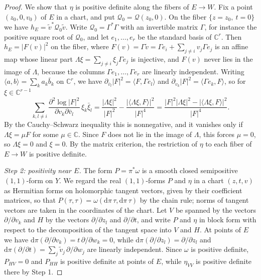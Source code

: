\begin{proof}
We show that $\eta$ is positive definite along the fibers of $E\to W$. Fix a point $(z_0,0,v_0)$ of $E$ in a chart, and put $\mathcal Q_0=\mathcal Q(z_0,0)$. On the fiber $\{z=z_0,\ t=0\}$ we have $h_E=\tilde v^*\mathcal Q_0\tilde v$. Write $\mathcal Q_0=\Gamma^*\Gamma$ with an invertible matrix $\Gamma$, for instance the positive square root of $\mathcal Q_0$, and let $e_1,\ldots,e_r$ be the standard basis of $\mathbb C^r$. Then $h_E=|F(v)|^2$ on the fiber, where $F(v)=\Gamma\tilde v=\Gamma e_i+\sum_{j\neq i}v_j\Gamma e_j$ is an affine map whose linear part $\Lambda\xi=\sum_{j\neq i}\xi_j\Gamma e_j$ is injective, and $F(v)$ never lies in the image of $\Lambda$, because the columns $\Gamma e_1,\ldots,\Gamma e_r$ are linearly independent. Writing $\langle a,b\rangle=\sum_ka_k\bar b_k$ on $\mathbb C^r$, we have $\partial_{\bar v_l}|F|^2=\langle F,\Gamma e_l\rangle$ and $\partial_{v_k}|F|^2=\langle\Gamma e_k,F\rangle$, so for $\xi\in\mathbb C^{r-1}$
\[
 \sum_{k,l\neq i}\frac{\partial^2\log|F|^2}{\partial v_k\partial\bar v_l}\,\xi_k\bar\xi_l
 =\frac{|\Lambda\xi|^2}{|F|^2}-\frac{|\langle\Lambda\xi,F\rangle|^2}{|F|^4}
 =\frac{|F|^2|\Lambda\xi|^2-|\langle\Lambda\xi,F\rangle|^2}{|F|^4}.
\]
By the Cauchy--Schwarz inequality this is nonnegative, and it vanishes only if $\Lambda\xi=\mu F$ for some $\mu\in\mathbb C$. Since $F$ does not lie in the image of $\Lambda$, this forces $\mu=0$, so $\Lambda\xi=0$ and $\xi=0$. By the matrix criterion, the restriction of $\eta$ to each fiber of $E\to W$ is positive definite.

\emph{Step 2: positivity near $E$.} The form $P=\pi^*\omega$ is a smooth closed semipositive $(1,1)$-form on $Y$. We regard the real $(1,1)$-forms $P$ and $\eta$ in a chart $(z,t,v)$ as Hermitian forms on holomorphic tangent vectors, given by their coefficient matrices, so that $P(\tau,\tau)=\omega(\mathrm d\pi\,\tau,\mathrm d\pi\,\tau)$ by the chain rule; norms of tangent vectors are taken in the coordinates of the chart. Let $V$ be spanned by the vectors $\partial/\partial v_k$ and $H$ by the vectors $\partial/\partial z_l$ and $\partial/\partial t$, and write $P$ and $\eta$ in block form with respect to the decomposition of the tangent space into $V$ and $H$. At points of $E$ we have $\mathrm d\pi(\partial/\partial v_k)=t\,\partial/\partial w_k=0$, while $\mathrm d\pi(\partial/\partial z_l)=\partial/\partial z_l$ and $\mathrm d\pi(\partial/\partial t)=\sum_j\tilde v_j\,\partial/\partial w_j$ are linearly independent. Since $\omega$ is positive definite, $P_{HV}=0$ and $P_{HH}$ is positive definite at points of $E$, while $\eta_{VV}$ is positive definite there by Step 1.


\end{proof}
